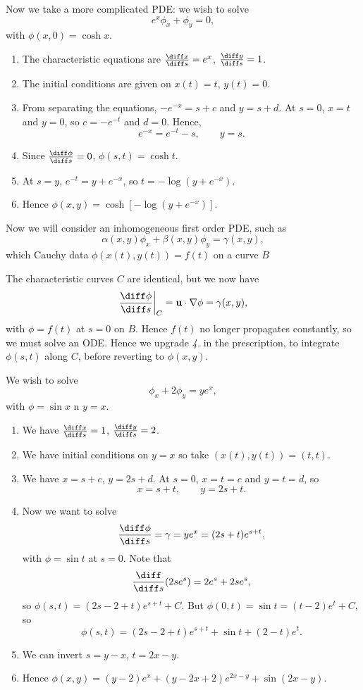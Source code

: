 \documentclass[12pt]{article}
\begin{document}
\begin{exbox}
	Now we take a more complicated PDE: we wish to solve
	\[
	e^{x} \phi_x + \phi_y = 0
	,\]
	with $\phi(x, 0) = \cosh x$.
	\begin{enumerate}[1.]
		\item The characteristic equations are $\frac{\diff x}{\diff s} = e^{x}$, $\frac{\diff y}{\diff s} = 1$.
		\item The initial conditions are given on $x(t) = t$, $y(t) = 0$.
		\item From separating the equations, $-e^{-x} = s + c$ and $y = s + d$. At $s = 0$, $x = t$ and $y = 0$, so $c = -e^{-t}$ and $d = 0$. Hence,
			\[
			e^{-x} = e^{-t} - s, \qquad y = s
			.\]
		\item Since $\frac{\diff \phi}{\diff s} = 0$, $\phi(s, t) = \cosh t$.
		\item At $s = y$, $e^{-t} = y + e^{-x}$, so $t = - \log(y + e^{-x})$.
		\item Hence $\phi(x, y) = \cosh[- \log(y + e^{-x})]$.
	\end{enumerate}
\end{exbox}

Now we will consider an inhomogeneous first order PDE, such as
\[
	\alpha(x, y) \phi_x + \beta(x, y) \phi_y = \gamma(x, y)
,\]
which Cauchy data $\phi(x(t), y(t)) = f(t)$ on a curve $B$ 

The characteristic curves $C$ are identical, but we now have
\[
	\frac{\diff \phi}{\diff s} \biggr|_{C} = \mathbf{u} \cdot \nabla \phi = \gamma(x, y)
,\]
with $\phi = f(t)$ at $s = 0$ on $B$. Hence $f(t)$ no longer propagates constantly, so we must solve an ODE. Hence we upgrade \textit{4.} in the prescription, to integrate $\phi(s, t)$ along $C$, before reverting to $\phi(x, y)$.

\begin{exbox}
	We wish to solve
	\[
	\phi_x + 2 \phi_y = ye^{x}
	,\]
	with $\phi = \sin x$ n $y = x$.
	\begin{enumerate}[1.]
		\item We have $\frac{\diff x}{\diff s} = 1$, $\frac{\diff y}{\diff s}= 2$.
		\item We have initial conditions on $y = x$ so take $(x(t), y(t)) = (t, t)$.
		\item We have $x = s + c$, $y = 2s + d$. At $s = 0$, $x = t = c$ and $y = t = d$, so
			\[
			x = s + t, \qquad y = 2s + t
			.\]
		\item Now we want to solve
			\[\frac{\diff \phi}{\diff s}= \gamma = ye^{x} = (2s + t)e^{s + t},\]
			with $\phi = \sin t$ at $s = 0$. Note that
			\[
				\frac{\diff}{\diff s}(2s e^{s}) = 2e^{s}+ 2se^{s}
			,\]
			so $\phi(s, t) = (2s - 2 + t)e^{s+t} + C$. But $\phi(0, t) = \sin t = (t - 2)e^{t} + C$, so
			\[
				\phi(s, t) = (2s - 2 + t)e^{s + t} + \sin t + (2 - t)e^{t}
			.\]
		\item We can invert $s = y - x$, $t = 2x - y$.
		\item Hence $\phi(x, y) = (y - 2)e^{x} + (y - 2x + 2)e^{2x - y} + \sin (2x - y)$.
	\end{enumerate}
\end{exbox}
\end{document}
